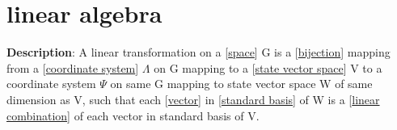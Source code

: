 \documentclass[../main.tex]{subfiles}
\begin{document}
\chapter{linear algebra}


\begin{statement}
\label{statement:Linear Transformation}\hspace*{0pt}\par
\end{statement}
\textbf{Description}:
A linear transformation on a [\hyperref[statement:Space]{space}] G is a [\hyperref[statement:Bijection]{bijection}] mapping from a [\hyperref[statement:Coordinate System]{coordinate system}] $ \Lambda $ on G mapping to a [\hyperref[statement:State Vector Space]{state vector space}] V to a coordinate system $\Psi$ on same G mapping to state vector space W of same dimension as V, such that each [\hyperref[statement:Vector]{vector}] in [\hyperref[statement:Standard basis]{standard basis}] of W is a [\hyperref[statement:Linear Combination]{linear combination}] of each vector in standard basis of V.
\par
\end{document}
